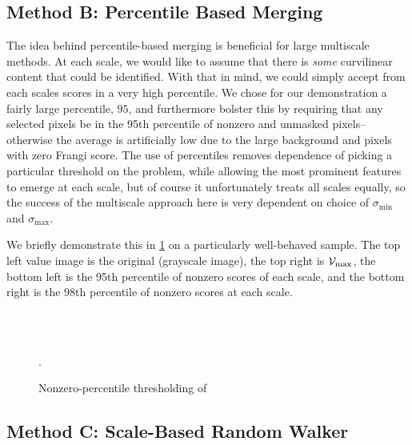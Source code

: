 \subsection{Method B: Percentile Based Merging}

The idea behind percentile-based merging is beneficial for large multiscale methods. At each scale, we would like to assume that there is \textit{some} curvilinear content that could be identified. With that in mind, we could simply accept from each scales scores in a very high percentile. We chose for our demonstration a fairly large percentile, $95$, and furthermore bolster this by requiring that any selected pixels be in the 95th percentile of nonzero and unmasked pixels--otherwise the average is artificially low due to the large background and pixels with zero Frangi score. The use of percentiles removes dependence of picking a particular threshold on the problem, while allowing the most prominent features to emerge at each scale, but of course it unfortunately treats all scales equally, so the success of the multiscale approach here is very dependent on choice of $\sigma_{\min}$ and $\sigma_{\max}$.

	We briefly demonstrate this in \cref{fig:qthresh_demo2} on a particularly well-behaved sample. The top left value image is the original (grayscale image), the top right is $\mathcal{V}_{\max}$, the bottom left is the 95th percentile of nonzero scores of each scale, and the bottom right is the 98th percentile of nonzero scores at each scale.

\begin{figure} \centering
   \;
   \\
   \;
   \\
  \caption{Nonzero-percentile thresholding of \Vmax}.
  \label{fig:qthresh_demo2}
\end{figure}


\subsection{Method C: Scale-Based Random Walker}


